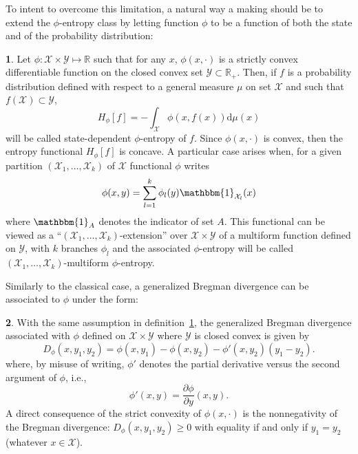 \documentclass[english]{elsarticle}
\theoremstyle{definition}
\newtheorem{defn}{\protect\definitionname}
\theoremstyle{plain}
\theoremstyle{plain}
\def\dmu{\mathrm{d}\mu}
\def\Rset{\mathbb{R}}
\def\X{\mathcal{X}}
\def\Y{\mathcal{Y}}
\def\un{\mathbbm{1}}
\providecommand{\definitionname}{Definition}
\begin{document}
To  intent to overcome  this limitation,  a natural  way a  making should  be to
extend the $\phi$-entropy  class by letting function $\phi$ to  be a function of
both the state and of the probability distribution:
\begin{defn}\label{def:asym_phi-entropy}
  Let $\phi: \X \times \Y \mapsto  \Rset$ such that for any $x$, $\phi(x,\cdot)$
  is  a strictly convex  differentiable function  on the  closed convex  set $\Y
  \subset \Rset_+$.   Then, if  $f$ is a  probability distribution  defined with
  respect to  a general measure $\mu$ on  set $\X$ and such  that $f(\X) \subset
  \Y$,
  \begin{equation}\label{eq:asym_phi-entropy}
    H_\phi[f] = - \int_{\X} \phi(x,f(x)) \dmu(x)
  \end{equation}
  will be  called state-dependent $\phi$-entropy of  $f$.  Since $\phi(x,\cdot)$
  is convex, then the entropy functional $H_\phi[f]$ is concave.
%
  A particular case arises when, for  a given partition $(\X_1 , \ldots , \X_k)$
  of $\X$ functional $\phi$ writes
  \begin{equation}\label{eq:multiform_phi-entropy}
    \phi(x,y) = \sum_{l=1}^k \phi_l(y) \un_{\X_l}(x)
  \end{equation}
  where  $\un_{A}$ denotes the  indicator of  set $A$.   This functional  can be
  viewed as  a ``$(\X_1 , \ldots ,  \X_k)$-extension'' over $\X \times  \Y$ of a
  multiform  function  defined on  $\Y$,  with  $k$  branches $\phi_l$  and  the
  associated $\phi$-entropy  will be called  $(\X_1 , \ldots  , \X_k)$-multiform
  $\phi$-entropy.
\end{defn}

Similarly  to  the classical  case,  a  generalized  Bregman divergence  can  be
associated to $\phi$ under the form:
\begin{defn}\label{def:GeneralizedBregman} 
  With  the   same  assumption  in   definition~\ref{def:asym_phi-entropy},  the
  generalized Bregman  divergence associated with  $\phi$ defined on  $\X \times
  \Y$ where $\Y$ is closed convex is given by
  \begin{equation}
    D_{\phi}(x,y_1,y_2) = \phi(x,y_1) - \phi(x,y_2) - \phi'(x,y_2)
    \left( y_1 - y_2 \right).
  \end{equation}
  where, by misuse of writing, $\phi'$ denotes the partial derivative versus the
  second argument of $\phi$, i.e.,
  \[
  \phi'(x,y) = \frac{\partial \phi}{\partial y}(x,y).
  \]
  A  direct  consequence of  the  strict  convexity  of $\phi(x,\cdot)$  is  the
  nonnegativity  of the  Bregman  divergence: $D_{\phi}(x,y_1,y_2)  \ge 0$  with
  equality if and only if $y_1 = y_2$ (whatever $x \in \X$).
\end{defn}
\end{document}

